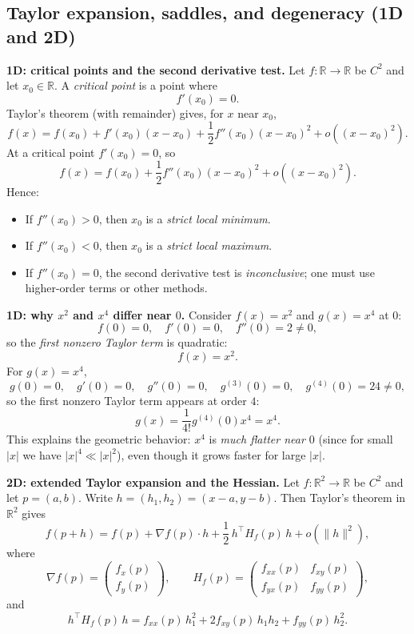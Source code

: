 \documentclass[12pt,a4paper]{article}
\theoremstyle{plain}
\theoremstyle{definition}      %
\begin{document}
	\subsection*{Taylor expansion, saddles, and degeneracy (1D and 2D)}
	
	\noindent\textbf{1D: critical points and the second derivative test.}
	Let $f:\mathbb{R}\to\mathbb{R}$ be $C^2$ and let $x_0\in\mathbb{R}$.
	A \emph{critical point} is a point where
	\[
	f'(x_0)=0.
	\]
	Taylor's theorem (with remainder) gives, for $x$ near $x_0$,
	\[
	f(x)=f(x_0)+f'(x_0)(x-x_0)+\frac12 f''(x_0)(x-x_0)^2 + o\!\left((x-x_0)^2\right).
	\]
	At a critical point $f'(x_0)=0$, so
	\[
	f(x)=f(x_0)+\frac12 f''(x_0)(x-x_0)^2 + o\!\left((x-x_0)^2\right).
	\]
	Hence:
	\begin{itemize}
		\item If $f''(x_0)>0$, then $x_0$ is a \emph{strict local minimum}.
		\item If $f''(x_0)<0$, then $x_0$ is a \emph{strict local maximum}.
		\item If $f''(x_0)=0$, the second derivative test is \emph{inconclusive}; one must use higher-order terms or other methods.
	\end{itemize}
	
	\medskip
	\noindent\textbf{1D: why $x^2$ and $x^4$ differ near $0$.}
	Consider $f(x)=x^2$ and $g(x)=x^4$ at $0$:
	\[
	f(0)=0,\quad f'(0)=0,\quad f''(0)=2\neq 0,
	\]
	so the \emph{first nonzero Taylor term} is quadratic:
	\[
	f(x)=x^2.
	\]
	For $g(x)=x^4$,
	\[
	g(0)=0,\quad g'(0)=0,\quad g''(0)=0,\quad g^{(3)}(0)=0,\quad g^{(4)}(0)=24\neq 0,
	\]
	so the first nonzero Taylor term appears at order $4$:
	\[
	g(x)=\frac{1}{4!}g^{(4)}(0)x^4=x^4.
	\]
	This explains the geometric behavior: $x^4$ is \emph{much flatter near $0$} (since for small $|x|$ we have $|x|^4\ll |x|^2$), even though it grows faster for large $|x|$.
	
	\bigskip
	\noindent\textbf{2D: extended Taylor expansion and the Hessian.}
	Let $f:\mathbb{R}^2\to\mathbb{R}$ be $C^2$ and let $p=(a,b)$.
	Write $h=(h_1,h_2)=(x-a,y-b)$. Then Taylor's theorem in $\mathbb{R}^2$ gives
	\[
	f(p+h)
	=
	f(p)
	+
	\nabla f(p)\cdot h
	+
	\frac12\, h^\top H_f(p)\, h
	+
	o\!\left(\|h\|^2\right),
	\]
	where
	\[
	\nabla f(p)=
	\begin{pmatrix}
		f_x(p)\\[2pt]
		f_y(p)
	\end{pmatrix},
	\qquad
	H_f(p)=
	\begin{pmatrix}
		f_{xx}(p) & f_{xy}(p)\\[2pt]
		f_{yx}(p) & f_{yy}(p)
	\end{pmatrix},
	\]
	and
	\[
	h^\top H_f(p)\,h
	=
	f_{xx}(p)\,h_1^2 + 2f_{xy}(p)\,h_1h_2 + f_{yy}(p)\,h_2^2.
	\]
	
\end{document}
